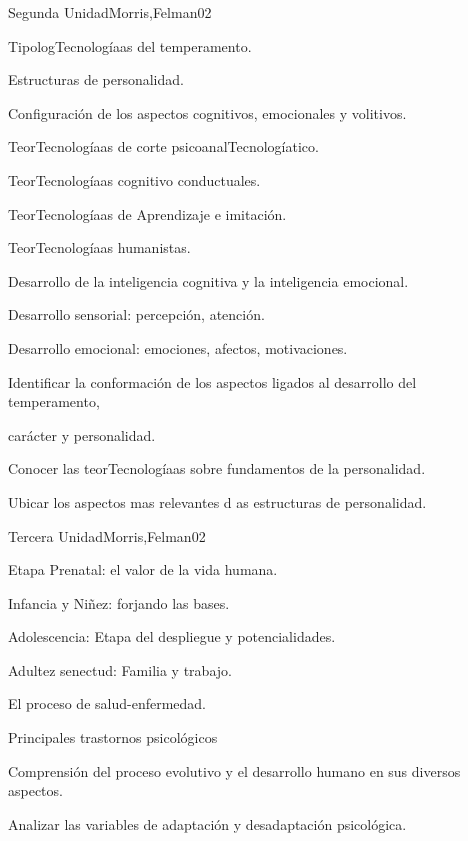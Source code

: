 \begin{syllabus}
\begin{unit}{Segunda Unidad}{Morris,Felman}{0}{2}
\begin{topics}
	\item TipologTecnologíaas del temperamento.
	\item Estructuras de personalidad.
	\item Configuración de los aspectos cognitivos, emocionales y volitivos.
	\item TeorTecnologíaas de corte psicoanalTecnologíatico.
	\item TeorTecnologíaas cognitivo conductuales.
	\item TeorTecnologíaas de Aprendizaje e imitación.
	\item TeorTecnologíaas humanistas.
	\item Desarrollo de la inteligencia cognitiva y la inteligencia emocional.
	\item Desarrollo sensorial: percepción, atención.
	\item Desarrollo emocional: emociones, afectos, motivaciones.
\end{topics}
\begin{unitgoals}
	\item Identificar la conformación de los aspectos ligados al desarrollo del temperamento,  
	\item       carácter y personalidad.
	\item Conocer las teorTecnologíaas sobre fundamentos de la personalidad.
	\item Ubicar los aspectos mas relevantes d as estructuras de personalidad.
\end{unitgoals}
\end{unit}

\begin{unit}{Tercera Unidad}{Morris,Felman}{0}{2}
\begin{topics}
	\item  Etapa Prenatal: el valor de la vida humana.
	\item Infancia y Niñez: forjando las bases.
	\item Adolescencia: Etapa del despliegue y potencialidades.
	\item Adultez senectud: Familia y trabajo.
	\item El proceso de salud-enfermedad.
	\item Principales trastornos psicológicos
\end{topics}
\begin{unitgoals}
	\item Comprensión del proceso evolutivo y el desarrollo humano en sus diversos aspectos.
	\item Analizar las variables de adaptación y desadaptación psicológica.
\end{unitgoals}
\end{unit}


\end{syllabus}

